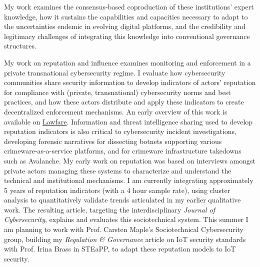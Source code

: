 My work examines the consensus-based coproduction of these institutions' expert knowledge, how it sustains the capabilities and capacities necessary to adapt to the uncertainties endemic in evolving digital platforms, and the credibility and legitimacy challenges of integrating this knowledge into conventional governance structures. 


%




My work on reputation and influence examines monitoring and enforcement in a private transnational cybersecurity regime.
%
I evaluate how cybersecurity communities share security information to develop indicators of actors' reputation for compliance with (private, transnational) cybersecurity norms and best practices, and how these actors distribute and apply these indicators to create decentralized enforcement mechanisms.
%
An early overview of this work is available on  \href{https://www.lawfareblog.com/role-norms-internet-security-reputation-and-its-limits}{Lawfare}.
%
Information and threat intelligence sharing used to develop reputation indicators is also critical to cybersecurity incident investigations, developing forensic narratives for dissecting botnets supporting various crimeware-as-a-service platforms, and for crimeware infrastructure takedowns such as Avalanche.
% 
My early work on reputation was based on interviews amongst private actors managing these systems to characterize and understand the technical and institutional mechanisms. 
%
I am currently integrating approximately 5 years of reputation indicators (with a 4 hour sample rate), using cluster analysis to quantitatively validate trends articulated in my earlier qualitative work.
%
The resulting article, targeting the interdisciplinary \emph{Journal of Cybersecurity}, explains and evaluates this sociotechnical system.
%
This summer I am planning to work with Prof. Carsten Maple's Sociotechnical Cybersecurity group, building my \emph{Regulation \& Governance} article on IoT security standards with Prof. Irina Brass in STEaPP, to adapt these reputation models to IoT security. 
